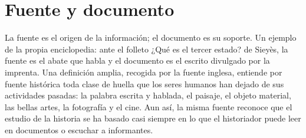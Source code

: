\documentclass{book}
\begin{document}

\section{Fuente y documento}

La fuente es el origen de la información; el documento es su soporte. Un ejemplo de la propia enciclopedia: ante el folleto ¿Qué es el tercer estado? de Sieyès, la fuente es el abate que habla y el documento es el escrito divulgado por la imprenta. Una definición amplia, recogida por la fuente inglesa, entiende por fuente histórica toda clase de huella que los seres humanos han dejado de sus actividades pasadas: la palabra escrita y hablada, el paisaje, el objeto material, las bellas artes, la fotografía y el cine. Aun así, la misma fuente reconoce que el estudio de la historia se ha basado casi siempre en lo que el historiador puede leer en documentos o escuchar a informantes.

\end{document}
